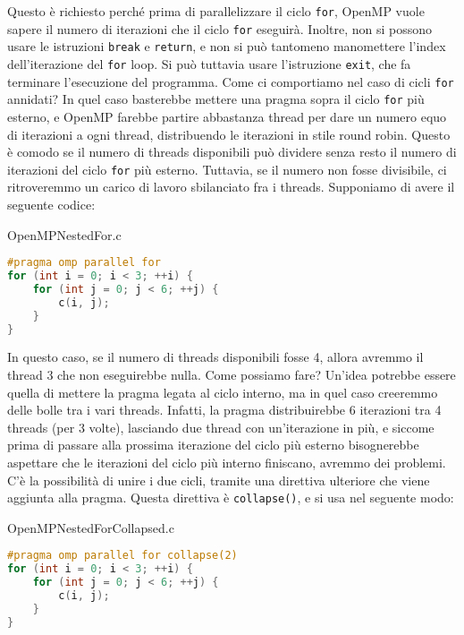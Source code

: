 
Questo è richiesto perché prima di parallelizzare il ciclo \verb|for|, OpenMP vuole sapere il numero di iterazioni che il ciclo \verb|for| eseguirà. Inoltre, non si possono usare le istruzioni \verb|break| e \verb|return|, e non si può tantomeno manomettere l'index dell'iterazione del \verb|for| loop. Si può tuttavia usare l'istruzione \verb|exit|, che fa terminare l'esecuzione del programma.
\nwl
Come ci comportiamo nel caso di cicli \verb|for| annidati? In quel caso basterebbe mettere una pragma sopra il ciclo \verb|for| più esterno, e OpenMP farebbe partire abbastanza thread per dare un numero equo di iterazioni a ogni thread, distribuendo le iterazioni in stile round robin. Questo è comodo se il numero di threads disponibili può dividere senza resto il numero di iterazioni del ciclo \verb|for| più esterno. Tuttavia, se il numero non fosse divisibile, ci ritroveremmo un carico di lavoro sbilanciato fra i threads. Supponiamo di avere il seguente codice:

\begin{codeblock}{OpenMPNestedFor.c}
    \begin{lstlisting}[language = C]
#pragma omp parallel for
for (int i = 0; i < 3; ++i) {
    for (int j = 0; j < 6; ++j) {
        c(i, j);
    }
}\end{lstlisting}
\end{codeblock}

In questo caso, se il numero di threads disponibili fosse 4, allora avremmo il thread 3 che non eseguirebbe nulla. Come possiamo fare? Un'idea potrebbe essere quella di mettere la pragma legata al ciclo interno, ma in quel caso creeremmo delle bolle tra i vari threads. Infatti, la pragma distribuirebbe 6 iterazioni tra 4 threads (per 3 volte), lasciando due thread con un'iterazione in più, e siccome prima di passare alla prossima iterazione del ciclo più esterno bisognerebbe aspettare che le iterazioni del ciclo più interno finiscano, avremmo dei problemi.
\nwl
C'è la possibilità di unire i due cicli, tramite una direttiva ulteriore che viene aggiunta alla pragma. Questa direttiva è \verb|collapse()|, e si usa nel seguente modo:

\begin{codeblock}{OpenMPNestedForCollapsed.c}
    \begin{lstlisting}[language = C]
#pragma omp parallel for collapse(2)
for (int i = 0; i < 3; ++i) {
    for (int j = 0; j < 6; ++j) {
        c(i, j);
    }
}\end{lstlisting}
\end{codeblock}

